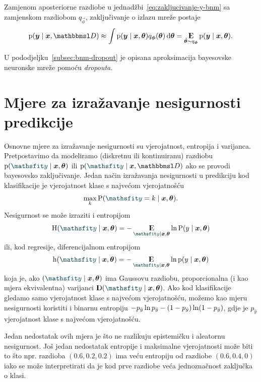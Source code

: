 \documentclass[utf8, diplomski, lmodern]{fer}
\begin{document}
Zamjenom aposteriorne razdiobe u jednadžbi~\eqref{eq:zakljucivanje-y-bnm} sa zamjenskom razdiobom $q_{\vec\phi}$, zaključivanje o izlazu mreže postaje
\begin{align} \label{eq:zakljucivanje-y-bnm-q}
\p(\vec y\mid \vec x, \set{D})
\approx \int\p(\vec y\mid \vec x,\vec\theta)q_{\vec\phi}(\vec\theta) \dif{\vec\theta}
= \E_{\tilde{\vec\theta}\sim q_{\vec\phi}}\p(\vec y\mid\vec x,\vec\theta) \text{.}
\end{align}

U pododjeljku~\ref{subsec:bnm-dropout} je opisana aproksimacija bayesovske neuronske mreže pomoću \textit{dropouta}.


\section{Mjere za izražavanje nesigurnosti predikcije} \label{sec:mjere-nesigurnosti}

Osnovne mjere za izražavanje nesigurnosti su vjerojatnost, entropija i varijanca. Pretpostavimo da modeliramo (diskretnu ili kontinuiranu) razdiobu $\p(\rvar y\mid\vec x,\vec\theta)$ ili $\p(\rvar y\mid\vec x,\set D)$ ako se provodi bayesovsko zaključivanje. Jedan način izražavanja nesigurnosti u predikciju kod klasifikacije je vjerojatnost klase s najvećom vjerojatnošću
\begin{align}
\max_k \P(\rvar y=k\mid\vec x,\vec\theta) \text{.}
\end{align}
Nesigurnost se može izraziti i entropijom
\begin{align}
\H(\rvar y\mid\vec x,\vec\theta)=-\E_{\rvar y\mid\vec x,\vec\theta}\ln\P\del{y\mid\vec x,\vec\theta}
\end{align}
ili, kod regresije, diferencijalnom entropijom
\begin{align}
\h(\rvar y\mid\vec x,\vec\theta)=-\E_{\rvar y\mid\vec x,\vec\theta}\ln\p\del{y\mid\vec x,\vec\theta}
\end{align}
koja je, ako $\del{\rvar y\mid\vec x,\vec\theta}$ ima Gaussovu razdiobu, proporcionalna (i kao mjera ekvivalentna) varijanci $\D\del{\rvar y\mid\vec x,\vec\theta}$. Ako kod klasifikacije gledamo samo vjerojatnost klase s najvećom vjerojatnošću, možemo kao mjeru nesigurnosti koristiti i binarnu entropiju $-p_{\hat{y}}\ln p_{\hat{y}}-\del{1-p_{\hat{y}}}\ln\del{1-p_{\hat{y}}}$, gdje je $p_{\hat{y}}$ vjerojatnost klase s najvećom vjerojatnošću.

Jedan nedostatak ovih mjera je što ne razlikuju epistemičku i aleatornu nesigurnost. Još jedan nedostatak entropije i maksimalne vjerojatnosti može biti to što npr. razdioba $(0.6,0.2,0.2)$ ima veću entropiju od razdiobe $(0.6,0.4,0)$ iako se može interpretirati da je kod prve razdiobe veća jednoznačnost zaključka o klasi.
\end{document}
